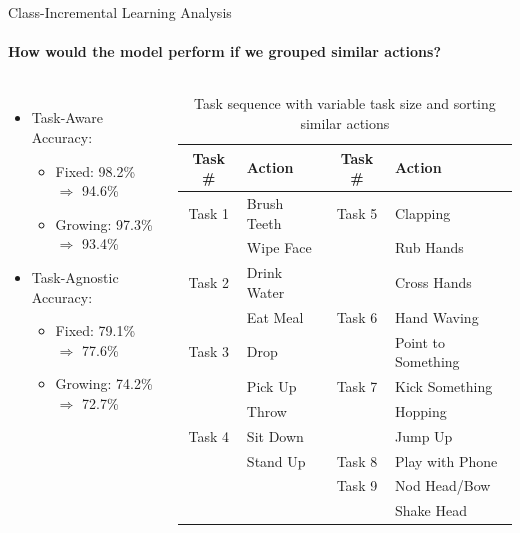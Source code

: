 \documentclass[aspectratio=169, xcolor=dvipsnames]{beamer}
\begin{document}
\begin{frame}{Class-Incremental Learning Analysis}
      \framesubtitle{How would the model perform if we grouped similar actions?}%
      
      \vspace{0.5cm}
      \begin{columns}
      \vspace{-0.75cm}
      \begin{itemize}
            \item Task-Aware Accuracy: 
            \begin{itemize}
                  \item \small Fixed: 98.2\% $\Longrightarrow$ 94.6\%
                  \item \small Growing: 97.3\% $\Longrightarrow$ 93.4\%
            \end{itemize}
            \item Task-Agnostic Accuracy: 
            \begin{itemize}
                  \item \small Fixed: 79.1\% $\Longrightarrow$ 77.6\%
                  \item \small Growing: 74.2\% $\Longrightarrow$ 72.7\%
            \end{itemize}
      \end{itemize}
      
      \begin{table}[ht!]
      \centering
      {\footnotesize
      \begin{tabular}{ | c | C{0.24\textwidth} || c | C{0.28\textwidth} | }
            \hline
            Task \# & Action & Task \# & Action \\
            \hline
            Task 1 & Brush Teeth & Task 5 & Clapping \\
            & Wipe Face & & Rub Hands \\ 
            Task 2 & Drink Water & & Cross Hands \\ 
            & Eat Meal & Task 6 & Hand Waving \\
            Task 3 & Drop & & Point to Something \\
            & Pick Up & Task 7 & Kick Something \\
            & Throw & & Hopping\\
            Task 4 & Sit Down & & Jump Up \\
            & Stand Up & Task 8 & Play with Phone \\
            \hline
            & & Task 9 & Nod Head/Bow \\
            & & & Shake Head \\
            \hline
      \end{tabular}
      }
      \caption{Task sequence with variable task size and sorting similar actions}
      \end{table}
      \end{columns}
\end{frame}
\end{document}
